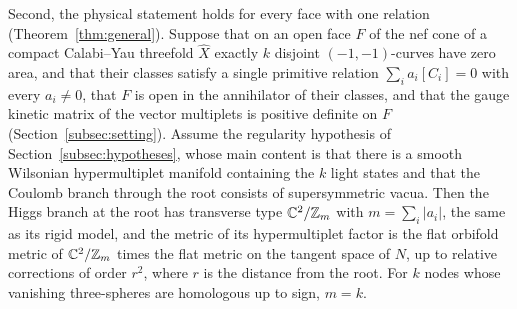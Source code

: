 Second, the physical statement holds for every face with one relation
(Theorem~\ref{thm:general}). Suppose that on an open face $F$ of the nef cone of a compact
Calabi--Yau threefold $\widehat X$ exactly $k$ disjoint $(-1,-1)$-curves have zero area, and that
their classes satisfy a single primitive relation $\sum_ia_i[C_i]=0$ with every $a_i\neq0$, that $F$ is
open in the annihilator of their classes, and that the gauge kinetic matrix of the vector multiplets is
positive definite on $F$ (Section~\ref{subsec:setting}).
Assume the regularity hypothesis of Section~\ref{subsec:hypotheses}, whose main content is that
there is a smooth Wilsonian hypermultiplet manifold containing the $k$ light states and that the
Coulomb branch through the root consists of supersymmetric vacua. Then the Higgs branch at the
root has transverse type $\mathbb C^2/\mathbb Z_m$ with $m=\sum_i|a_i|$, the same as its rigid model, and
the metric of its hypermultiplet factor is the flat orbifold metric of $\mathbb C^2/\mathbb Z_m$ times the flat
metric on the tangent space of $N$, up to relative corrections
of order $r^2$, where $r$ is the distance from the root. For $k$ nodes whose vanishing three-spheres are homologous up to sign, $m=k$.

